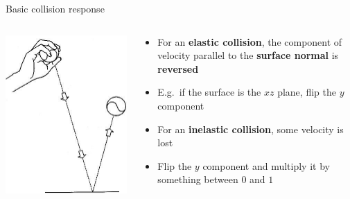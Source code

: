 \begin{frame}{Basic collision response}
	\begin{columns}
		\begin{column}{0.4\textwidth}
			\includegraphics[width=\textwidth]{bounce_reflection}
		\end{column}
		\begin{column}{0.58\textwidth}
			\begin{itemize}
				\pause\item For an \textbf{elastic collision}, the component of velocity parallel to the \textbf{surface normal}
					is \textbf{reversed}
				\pause\item E.g.\ if the surface is the $xz$ plane, flip the $y$ component
				\pause\item For an \textbf{inelastic collision}, some velocity is lost
				\pause\item Flip the $y$ component and multiply it by something between $0$ and $1$
			\end{itemize}
		\end{column}
	\end{columns}
\end{frame}

